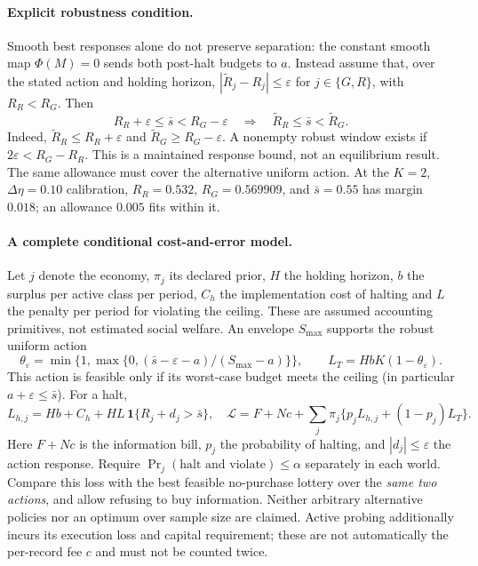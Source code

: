 \documentclass[12pt]{article}
\theoremstyle{definition}
\theoremstyle{remark}
\begin{document}
\paragraph{Explicit robustness condition.} Smooth best responses alone do not preserve separation: the constant smooth map $\Phi(M)=0$ sends both post-halt budgets to $a$. Instead assume that, over the stated action and holding horizon, $|\widetilde R_j-R_j|\le\varepsilon$ for $j\in\{G,R\}$, with $R_R<R_G$. Then
\begin{equation}\label{eq:reopt_gap}
 R_R+\varepsilon\le\bar s<R_G-\varepsilon
 \quad\Longrightarrow\quad \widetilde R_R\le\bar s<\widetilde R_G.
\end{equation}
Indeed, $\widetilde R_R\le R_R+\varepsilon$ and $\widetilde R_G\ge R_G-\varepsilon$. A nonempty robust window exists if $2\varepsilon<R_G-R_R$. This is a maintained response bound, not an equilibrium result. The same allowance must cover the alternative uniform action. At the $K=2$, $\Delta\eta=0.10$ calibration, $R_R=0.532$, $R_G=0.569909$, and $\bar s=0.55$ has margin $0.018$; an allowance $0.005$ fits within it.

\paragraph{A complete conditional cost-and-error model.} Let $j$ denote the economy, $\pi_j$ its declared prior, $H$ the holding horizon, $b$ the surplus per active class per period, $C_h$ the implementation cost of halting and $L$ the penalty per period for violating the ceiling. These are assumed accounting primitives, not estimated social welfare. An envelope $S_{\max}$ supports the robust uniform action
\[
\theta_\varepsilon=\min\{1,\max\{0,(\bar s-\varepsilon-a)/(S_{\max}-a)\}\},\qquad
 L_T=HbK(1-\theta_\varepsilon).
\]
This action is feasible only if its worst-case budget meets the ceiling (in particular $a+\varepsilon\le\bar s$). For a halt,
\[
 L_{h,j}=Hb+C_h+HL\,\mathbf1\{R_j+d_j>\bar s\},\quad
 \mathcal L=F+Nc+\sum_j\pi_j\{p_jL_{h,j}+(1-p_j)L_T\}.
\]
Here $F+Nc$ is the information bill, $p_j$ the probability of halting, and $|d_j|\le\varepsilon$ the action response. Require $\Pr_j(\text{halt and violate})\le\alpha$ separately in each world. Compare this loss with the best feasible no-purchase lottery over the \emph{same two actions}, and allow refusing to buy information. Neither arbitrary alternative policies nor an optimum over sample size are claimed. Active probing additionally incurs its execution loss and capital requirement; these are not automatically the per-record fee $c$ and must not be counted twice.
\end{document}
